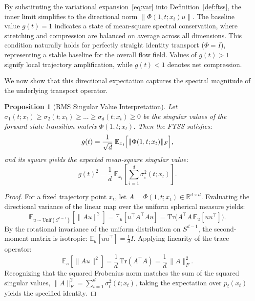 \documentclass[11pt]{article}
\newtheorem{proposition}[theorem]{Proposition}
\begin{document}
By substituting the variational expansion~\eqref{eq:var} into Definition~\ref{def:ftss}, the inner limit simplifies to the directional norm $\|\Phi(1,t; x_t)u\|$. The baseline value $g(t) = 1$ indicates a state of mean-square spectral conservation, where stretching and compression are balanced on average across all dimensions. This condition naturally holds for perfectly straight identity transport ($\Phi = I$), representing a stable baseline for the overall flow field. Values of $g(t) > 1$ signify local trajectory amplification, while $g(t) < 1$ denotes net compression.

We now show that this directional expectation captures the spectral magnitude of the underlying transport operator.

\begin{proposition}[RMS Singular Value Interpretation]
\label{prop:rms}
Let $\sigma_1(t; x_t) \ge \sigma_2(t; x_t) \ge \dots \ge \sigma_d(t; x_t) \ge 0$ be the singular values of the forward state-transition matrix $\Phi(1,t; x_t)$. Then the FTSS satisfies:
\begin{equation}
g(t) = \frac{1}{\sqrt{d}}\;\mathbb{E}_{x_t}\Bigl[\|\Phi(1,t; x_t)\|_F\Bigr],
\end{equation}
and its square yields the expected mean-square singular value:
\begin{equation}
g(t)^2 = \frac{1}{d}\;\mathbb{E}_{x_t}\!\left[\sum_{i=1}^{d} \sigma_i^2(t; x_t)\right].
\end{equation}
\end{proposition}

\begin{proof}
For a fixed trajectory point $x_t$, let $A = \Phi(1,t; x_t) \in \mathbb{R}^{d \times d}$. Evaluating the directional variance of the linear map over the uniform spherical measure yields:
\[
\mathbb{E}_{u \sim \mathrm{Unif}(S^{d-1})}[\|Au\|^2] = \mathbb{E}_u[u^\top A^\top A u] = \mathrm{Tr}\bigl(A^\top A\,\mathbb{E}_u[uu^\top]\bigr).
\]
By the rotational invariance of the uniform distribution on $S^{d-1}$, the second-moment matrix is isotropic: $\mathbb{E}_u[uu^\top] = \frac{1}{d}I$. Applying linearity of the trace operator:
\[
\mathbb{E}_u[\|Au\|^2] = \frac{1}{d}\,\mathrm{Tr}(A^\top A) = \frac{1}{d}\,\|A\|_F^2.
\]
Recognizing that the squared Frobenius norm matches the sum of the squared singular values, $\|A\|_F^2 = \sum_{i=1}^d \sigma_i^2(t; x_t)$, taking the expectation over $p_t(x_t)$ yields the specified identity.
\end{proof}
\end{document}
